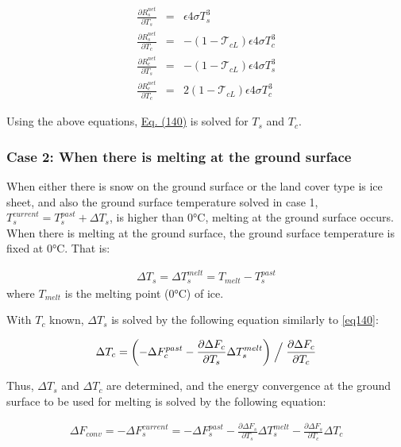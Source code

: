 \begin{eqnarray}
 \frac{\partial R^{net}_s}{\partial T_s} &=&
 \epsilon 4 \sigma T_s^3 \\
 \frac{\partial R^{net}_s}{\partial T_c} &=&
 - ( 1 - {\mathcal{T}}_{cL} ) \epsilon 4 \sigma T_c^3 \\
 \frac{\partial R^{net}_c}{\partial T_s} &=&
 - ( 1 - {\mathcal{T}}_{cL} ) \epsilon 4 \sigma T_s^3 \\
 \frac{\partial R^{net}_c}{\partial T_c} &=&
  2( 1 - {\mathcal{T}}_{cL} ) \epsilon 4 \sigma T_c^3
\end{eqnarray}

Using the above equations, \href{$eq140}{Eq. (140)} is solved for \(T_s\) and \(T_c\).

\hypertarget{case-2-when-there-is-melting-at-the-ground-surface}{%
\subsubsection{Case 2: When there is melting at the ground surface}\label{case-2-when-there-is-melting-at-the-ground-surface}}

When either there is snow on the ground surface or the land cover type is ice sheet, and also the ground surface temperature solved in case 1, \(T_s^{current} = T_s^{past}+\Delta T_s\), is higher than
0°C, melting at the ground surface occurs. When there is melting at the ground surface, the ground surface temperature is fixed at 0°C. That is:

\begin{eqnarray}
 \Delta T_s = \Delta T_s^{melt} = T_{melt} - T_s^{past}
\end{eqnarray} where \(T_{melt}\) is the melting point (0°C) of ice.

With \(T_c\) known, \(\Delta T_s\) is solved by the following equation similarly to \ref{eq140}:

\begin{eqnarray}
 \Delta T_c = \left( - \Delta F_c^{past}
            - \frac{\partial \Delta F_c}{\partial T_s} \Delta T_s^{melt}
              \right) \Bigm/ \frac{\partial \Delta F_c}{\partial T_c}
\end{eqnarray}

Thus, \(\Delta T_s\) and \(\Delta T_c\) are determined, and the energy convergence at the ground surface to be used for melting is solved by the following equation:

\begin{eqnarray}
 \Delta F_{conv} =
 - \Delta F_s^{current} = - \Delta F_s^{past}
 - \frac{\partial \Delta F_s}{\partial T_s} \Delta T_s^{melt}
 - \frac{\partial \Delta F_s}{\partial T_c} \Delta T_c
\end{eqnarray}

